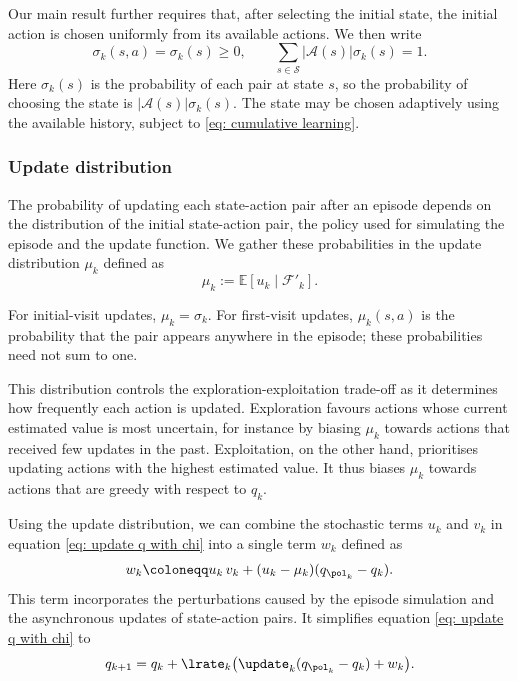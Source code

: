 Our main result further requires that, after selecting the initial state, the initial action is chosen uniformly from its available actions. We then write
\begin{equation}
\label{eq: uniform starts}
\sigma_k(s,a)=\sigma_k(s)\ge0,
\qquad
\sum_{s\in\mathcal S}|\mathcal A(s)|\sigma_k(s)=1.
\end{equation}
Here $\sigma_k(s)$ is the probability of each pair at state $s$, so the probability of choosing the state is $|\mathcal A(s)|\sigma_k(s)$. The state may be chosen adaptively using the available history, subject to \eqref{eq: cumulative learning}.

\subsubsection{Update distribution}

The probability of updating each state-action pair after an episode depends on the distribution of the initial state-action pair, the policy used for simulating the episode and the update function.
We gather these probabilities in the update distribution $\mu_k$ defined as
\[
\mu_k := \mathbb E [ u_k \mid \mathcal F'_k] .
\]

For initial-visit updates, $\mu_k=\sigma_k$. For first-visit updates, $\mu_k(s,a)$ is the probability that the pair appears anywhere in the episode; these probabilities need not sum to one.

This distribution controls the exploration-exploitation trade-off
as it determines how frequently each action is updated.
Exploration favours actions whose current estimated value is most uncertain, for instance by biasing $\mu_k$ towards actions that received few updates in the past.
Exploitation, on the other hand, prioritises updating actions with the highest estimated value. It thus biases $\mu_k$ towards actions that are greedy with respect to $q_k$.

Using the update distribution,
we can combine the stochastic terms $u_k$ and $v_k$ in equation \eqref{eq: update q with chi} into a single term $w_k$ defined as
\begin{align}
\label{eq: definition combined noise}
    w_k
    \coloneqq
    u_k \, v_k + (u_k - \mu_k) ( q_{\pol_k} - q_k ) .
\end{align}
This term incorporates the perturbations caused by the episode simulation and the asynchronous updates of state-action pairs.
It simplifies equation \eqref{eq: update q with chi} to
\begin{align}
\label{eq: mcopi not yet sri}
    q_{k+1}
    =
    q_k + \lrate_k \big( \update_k ( q_{\pol_k} - q_k ) + w_k \big) .
\end{align}


